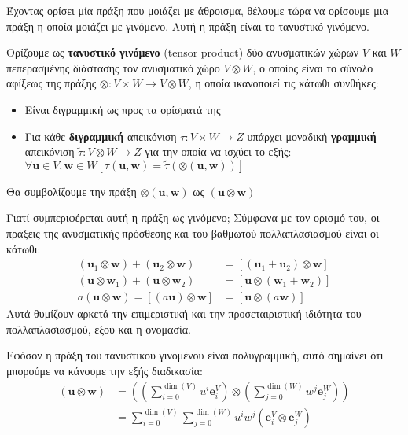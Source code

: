 \documentclass[main.tex]{subfiles}
\begin{document}
	Έχοντας ορίσει μία πράξη που μοιάζει με άθροισμα, θέλουμε τώρα να ορίσουμε μια πράξη η οποία μοιάζει με γινόμενο. Αυτή η πράξη είναι το τανυστικό γινόμενο.
	\begin{definition}
		Ορίζουμε ως \textbf{τανυστικό γινόμενο} (tensor product) δύο ανυσματικών χώρων $V$ και $W$ πεπερασμένης διάστασης τον ανυσματικό χώρο $V\otimes W$, ο οποίος είναι το σύνολο αφίξεως της πράξης ${\otimes:V\times W \rightarrow V\otimes W}$, η οποία ικανοποιεί τις κάτωθι συνθήκες:
		\begin{itemize}
			\item Είναι διγραμμική ως προς τα ορίσματά της
			\item Για κάθε \textbf{διγραμμική} απεικόνιση ${\tau : V\times W \rightarrow Z}$ υπάρχει μοναδική \textbf{γραμμική} απεικόνιση ${\tilde{\tau}:V\otimes W \rightarrow Z}$ για την οποία να ισχύει το εξής: $\forall \boldsymbol{u} \in V, \boldsymbol{w} \in W[\tau(\boldsymbol{u},\boldsymbol{w}) = \tilde{\tau}(\otimes(\boldsymbol{u},\boldsymbol{w}))]$
 		\end{itemize}
 		Θα συμβολίζουμε την πράξη $\otimes(\boldsymbol{u},\boldsymbol{w})$ ως $(\boldsymbol{u}\otimes\boldsymbol{w})$
 	\end{definition}
 	Γιατί συμπεριφέρεται αυτή η πράξη ως γινόμενο; Σύμφωνα με τον ορισμό του, οι πράξεις της ανυσματικής πρόσθεσης και του βαθμωτού πολλαπλασιασμού είναι οι κάτωθι:
 	\begin{align*}
 		(\boldsymbol{u}_1\otimes\boldsymbol{w}) + (\boldsymbol{u}_2\otimes\boldsymbol{w}) &= [(\boldsymbol{u}_1 + \boldsymbol{u}_2)\otimes\boldsymbol{w}] \\
 		(\boldsymbol{u}\otimes\boldsymbol{w}_1) + (\boldsymbol{u}\otimes\boldsymbol{w}_2) &= [\boldsymbol{u}\otimes(\boldsymbol{w}_1 + \boldsymbol{w}_2)] \\
 		a(\boldsymbol{u}\otimes\boldsymbol{w}) = [(a\boldsymbol{u})\otimes\boldsymbol{w}] &= [\boldsymbol{u}\otimes(a\boldsymbol{w})]
 	\end{align*}
 	Αυτά θυμίζουν αρκετά την επιμεριστική και την προσεταιριστική ιδιότητα του πολλαπλασιασμού, εξού και η ονομασία.
 	
 	Εφόσον η πράξη του τανυστικού γινομένου είναι πολυγραμμική, αυτό σημαίνει ότι μπορούμε να κάνουμε την εξής διαδικασία:
 	\begin{align*}
 		(\boldsymbol{u}\otimes\boldsymbol{w}) &= \left(\left(\sum_{i=0}^{\dim(V)}u^i\boldsymbol{e}^V_i\right)\otimes\left(\sum_{j=0}^{\dim(W)}w^j\boldsymbol{e}^W_j\right)\right) \\
 		&= \sum_{i=0}^{\dim(V)}\sum_{j=0}^{\dim(W)}u^iw^j(\boldsymbol{e}^V_i\otimes\boldsymbol{e}^W_j)
 	\end{align*}
 
\end{document}

